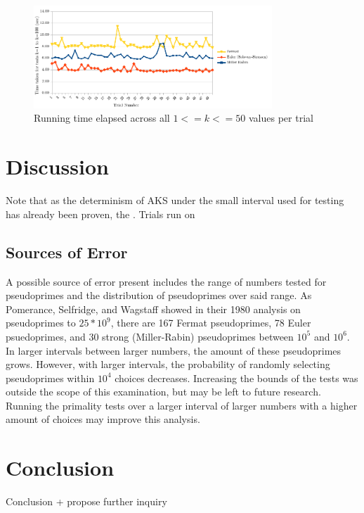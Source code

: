 \documentclass{article}
\begin{document}
\FloatBarrier
\begin{figure}[h!]
\label{fig:time_v_trial}
\caption{Running time elapsed across all $1 <= k <= 50$ values per trial}
\centering
\includegraphics[width=0.8\textwidth]{time_v_trial}
\end{figure}
\FloatBarrier


\section{Discussion}
Note that as the determinism of AKS under the small interval used for testing has already been proven, the . Trials run on 

\subsection{Sources of Error}
A possible source of error present includes the range of numbers tested for pseudoprimes and the distribution of pseudoprimes over said range. %
As Pomerance, Selfridge, and Wagstaff showed in their 1980 analysis on pseudoprimes to $25 * 10^9$, there are 167 Fermat pseudoprimes, 78 Euler psuedoprimes, and 30 strong (Miller-Rabin) pseudoprimes between $10^5$ and $10^6$. In larger intervals between larger numbers, the amount of these pseudoprimes grows. However, with larger intervals, the probability of randomly selecting pseudoprimes within $10^4$ choices decreases. Increasing the bounds of the tests was outside the scope of this examination, but may be left to future research. Running the primality tests over a larger interval of larger numbers with a higher amount of choices may improve this analysis. 

\section{Conclusion}
Conclusion + propose further inquiry

\nocite{*}


\end{document}
